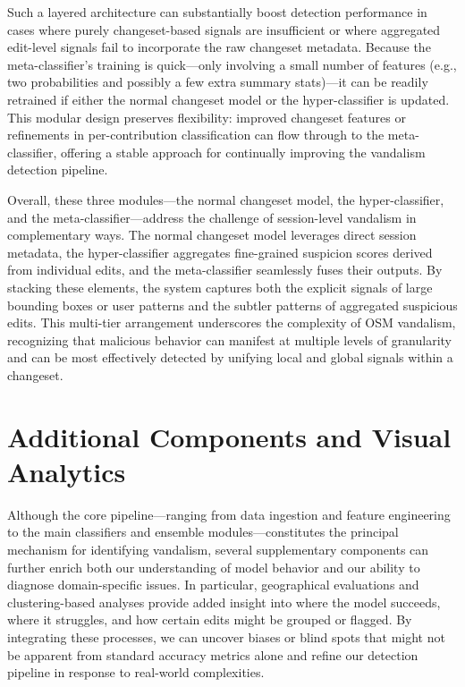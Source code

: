 \documentclass[
    13pt, %
    a4paper, %
    twoside, 
    DIV14, %
    listof=totoc, %
    bibliography=totoc, %
    index=totoc, %
    headsepline
]{scrreprt}
\begin{document}
Such a layered architecture can substantially boost detection performance in cases where purely changeset-based signals are insufficient or where aggregated edit-level signals fail to incorporate the raw changeset metadata. Because the meta-classifier’s training is quick—only involving a small number of features (e.g., two probabilities and possibly a few extra summary stats)—it can be readily retrained if either the normal changeset model or the hyper-classifier is updated. This modular design preserves flexibility: improved changeset features or refinements in per-contribution classification can flow through to the meta-classifier, offering a stable approach for continually improving the vandalism detection pipeline.

Overall, these three modules—the normal changeset model, the hyper-classifier, and the meta-classifier—address the challenge of session-level vandalism in complementary ways. The normal changeset model leverages direct session metadata, the hyper-classifier aggregates fine-grained suspicion scores derived from individual edits, and the meta-classifier seamlessly fuses their outputs. By stacking these elements, the system captures both the explicit signals of large bounding boxes or user patterns and the subtler patterns of aggregated suspicious edits. This multi-tier arrangement underscores the complexity of OSM vandalism, recognizing that malicious behavior can manifest at multiple levels of granularity and can be most effectively detected by unifying local and global signals within a changeset. 

\section{Additional Components and Visual Analytics}
\label{sec:additional_components_visual_analytics}

Although the core pipeline—ranging from data ingestion and feature engineering to the main classifiers and ensemble modules—constitutes the principal mechanism for identifying vandalism, several supplementary components can further enrich both our understanding of model behavior and our ability to diagnose domain-specific issues. In particular, geographical evaluations and clustering-based analyses provide added insight into where the model succeeds, where it struggles, and how certain edits might be grouped or flagged. By integrating these processes, we can uncover biases or blind spots that might not be apparent from standard accuracy metrics alone and refine our detection pipeline in response to real-world complexities.
\end{document}
